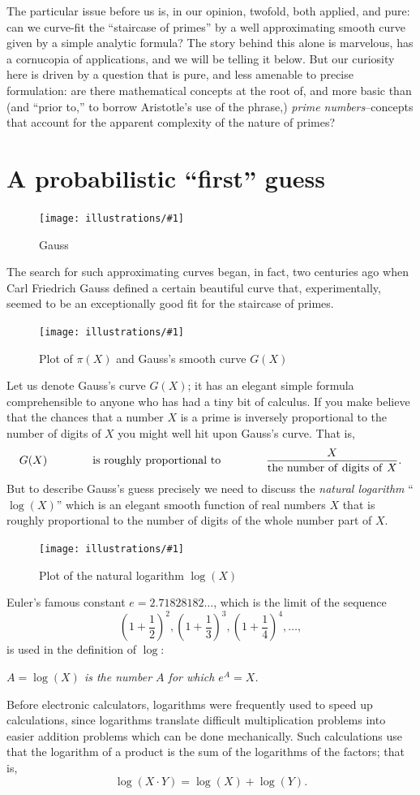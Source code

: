 \documentclass[openany]{book}
\newcommand{\ill}[3]{%
   \begin{figure}[H]%
   \vspace{-2ex}
   \centering%
   \texttt{[image: illustrations/\#1]}%
   \caption{#3}%
   \vspace{-2ex}
    \end{figure}}
\theoremstyle{plain}
\theoremstyle{definition}
\begin{document}
The particular issue before us is, in our opinion, twofold, both
applied, and pure: can we curve-fit the ``staircase of primes'' by a
well approximating smooth curve given by a simple analytic formula?  
The story behind this alone is
marvelous, has a cornucopia of applications, and we will be telling it
below. But our curiosity here is driven by a question that is pure,
and less amenable to precise formulation: are there mathematical
concepts at the root of, and more basic than (and ``prior to,'' to
borrow Aristotle's use of the phrase,) {\em prime numbers}--concepts
that account for the apparent complexity of the nature of primes?
   
   
\chapter{A probabilistic ``first'' guess\label{sec:firstguess} }

\ill{gauss}{.3}{Gauss}

The search for such approximating curves began, in fact, two centuries
ago when Carl Friedrich Gauss defined a certain beautiful curve that,
experimentally, seemed to be an exceptionally good fit for the
staircase of primes. 

\ill{pi_Li}{.7}{Plot of $\pi(X)$ and Gauss's smooth curve $G(X)$}

Let us denote Gauss's curve $G(X)$; it has an
elegant simple formula comprehensible to anyone who has had a tiny bit
of calculus.  If you make believe that the chances that a number $X$ is
a prime is inversely proportional to the number of digits of $X$ you
might well hit upon Gauss's curve.   
That is,
\vskip10pt
$$G(X)\hskip40pt  {\rm is\ roughly\ proportional\ to} \hskip40pt  {\frac{X}{{\rm the\ number\ of\ digits\ of\ } X}}.$$
\vskip10pt
But to describe Gauss's guess precisely we need to discuss the {\it natural logarithm} ``$\log(X)$'' which is an elegant smooth function of real numbers $X$ that is roughly proportional to the number of digits of the whole number part of $X$.



\ill{log}{.8}{Plot of the natural logarithm $\log(X)$}


 Euler's famous constant $e=2.71828182\ldots$, which is the limit 
 of the sequence 
 $$\left(1+{\frac{1}{2}}\right)^2,  
       \left(1+{\frac{1}{3}}\right)^3, 
       \left(1+{\frac{1}{4}}\right)^4, \dots,$$
is used in the definition of $\log$: 
\begin{center}
{\em $A = \log(X)$ is the number $A$ for which $e^A = X$.}
\end{center}
Before electronic calculators, logarithms were frequently used to 
speed up calculations, since logarithms translate difficult multiplication
problems into easier addition problems which can be done mechanically.
Such calculations use that the logarithm of a product is the sum of the logarithms
of the factors; that is, $$\log(X\cdot Y) = \log(X) + \log(Y).$$ 
\end{document}
